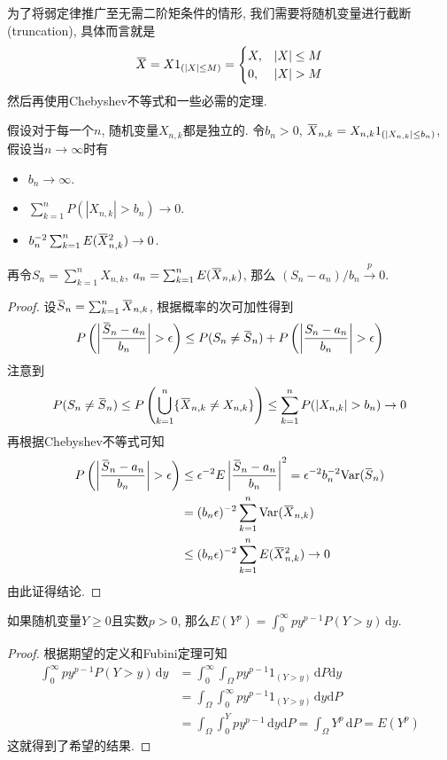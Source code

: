 \documentclass[cn, 12pt, math=mtpro2, bibstyle=apa, blue, twocol]{elegantbook}
\newcommand{\overbar}[1]{\mkern 1.5mu\overline{\mkern-1.5mu#1\mkern-1.5mu}\mkern 1.5mu}
\begin{document}
为了将弱定律推广至无需二阶矩条件的情形, 我们需要将随机变量进行截断 (truncation), 具体而言就是
$$\overbar{X}=X1_{(|X|\leq M)}=\begin{cases}
                                 X, & |X|\leq M \\
                                 0, & |X|>M
                               \end{cases}$$
然后再使用Chebyshev不等式和一些必需的定理.
\begin{theorem}[三角阵列的弱定律]\label{thm:thm2.7}
  假设对于每一个$n$, 随机变量$X_{n,k}$都是独立的. 令$b_n>0$, $\overbar{X}_{n,k}=X_{n,k}1_{(|X_{n,k}|\leq b_n)}$, 假设当$n\to\infty$时有
  \begin{itemize}
    \item $b_n\to\infty$.
    \item $\sum_{k=1}^{n}P(|X_{n,k}|>b_n)\to0$.
    \item $b_n^{-2}\sum_{k=1}^{n}E(\overbar{X}_{n,k}^2)\to0$.
  \end{itemize}
  再令$S_n=\sum_{k=1}^{n}X_{n,k}$, $a_n=\sum_{k=1}^{n}E(\overbar{X}_{n,k})$, 那么
  $(S_n-a_n)/b_n\xrightarrow{p}0$.
\end{theorem}
\begin{proof}
  设$\overbar{S}_n=\sum_{k=1}^{n}\overbar{X}_{n,k}$, 根据概率的次可加性得到
  $$P\left(\left|\frac{\overbar{S}_n-a_n}{b_n}\right|>\epsilon\right)\leq P(S_n\neq\overbar{S}_n)+P\left(\left|\frac{S_n-a_n}{b_n}\right|>\epsilon\right)$$
  注意到
  $$P(S_n\neq\overbar{S}_n)\leq P\left(\bigcup_{k=1}^n \{\overbar{X}_{n,k}\neq X_{n,k}\}\right)\leq \sum_{k=1}^{n}P(|X_{n,k}|>b_n)\to0$$
  再根据Chebyshev不等式可知
  \begin{align*}
  P\left(\left|\frac{\overbar{S}_n-a_n}{b_n}\right|>\epsilon\right)&\leq \epsilon^{-2}E\left|\frac{\overbar{S}_n-a_n}{b_n}\right|^2=\epsilon^{-2}b_n^{-2}\text{Var}(\overbar{S}_n) \\
  &=(b_n\epsilon)^{-2}\sum_{k=1}^{n}\text{Var}(\overbar{X}_{n,k}) \\
  &\leq (b_n\epsilon)^{-2}\sum_{k=1}^{n}E(\overbar{X}_{n,k}^2)\to0
  \end{align*}
  由此证得结论.
\end{proof}
\begin{lemma}\label{lem:lem2.2}
如果随机变量$Y\ge0$且实数$p>0$, 那么$E(Y^p)=\int_{0}^{\infty}py^{p-1}P(Y>y)\,\text{d}y$.
\end{lemma}
\begin{proof}
  根据期望的定义和Fubini定理可知
  \begin{align*}
  \int_{0}^{\infty}py^{p-1}P(Y>y)\,\text{d}y&=\int_{0}^{\infty}\int_{\Omega}py^{p-1}1_{(Y>y)}\,\text{d}P\text{d}y \\
  &=\int_\Omega\int_{0}^{\infty}py^{p-1}1_{(Y>y)}\,\text{d}y\text{d}P \\
  &=\int_\Omega\int_{0}^{Y}py^{p-1}\,\text{d}y\text{d}P=\int_\Omega Y^p\,\text{d}P=E(Y^p)
  \end{align*}
  这就得到了希望的结果.
\end{proof}
\end{document}
